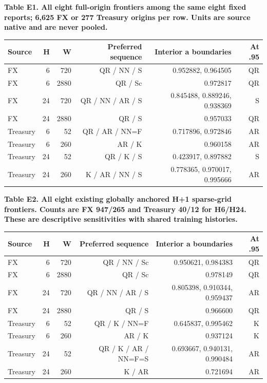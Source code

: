 \documentclass[10pt,a4paper]{article}
\begin{document}
\begin{center}
\begin{minipage}{\linewidth}
\small\textbf{Table E1. All eight full-origin frontiers among the same eight fixed reports; 6,625 FX or 277 Treasury origins per row. Units are source native and are never pooled.}\par\medskip
\centering\fontsize{8}{10}\selectfont
\begin{tabular}{lrrrrr}
\toprule
Source & H & W & Preferred sequence & Interior a boundaries & At .95 \\
\midrule
FX & 6 & 720 & QR / NN / S & 0.952882, 0.964505 & QR \\
FX & 6 & 2880 & QR / Sc & 0.972817 & QR \\
FX & 24 & 720 & QR / NN / AR / S & 0.845488, 0.889246, 0.938369 & S \\
FX & 24 & 2880 & QR / S & 0.957033 & QR \\
Treasury & 6 & 52 & QR / AR / NN=F & 0.717896, 0.972846 & AR \\
Treasury & 6 & 260 & AR / K & 0.960158 & AR \\
Treasury & 24 & 52 & QR / K / S & 0.423917, 0.897882 & S \\
Treasury & 24 & 260 & K / AR / NN / S & 0.778365, 0.970017, 0.995666 & AR \\
\bottomrule
\end{tabular}
\end{minipage}
\end{center}
\begin{center}
\begin{minipage}{\linewidth}
\small\textbf{Table E2. All eight existing globally anchored H+1 sparse-grid frontiers. Counts are FX 947/265 and Treasury 40/12 for H6/H24. These are descriptive sensitivities with shared training histories.}\par\medskip
\centering\fontsize{8}{10}\selectfont
\begin{tabular}{lrrrrr}
\toprule
Source & H & W & Preferred sequence & Interior a boundaries & At .95 \\
\midrule
FX & 6 & 720 & QR / NN / Sc & 0.950621, 0.984383 & QR \\
FX & 6 & 2880 & QR / Sc & 0.978149 & QR \\
FX & 24 & 720 & QR / NN / AR / S & 0.805398, 0.910344, 0.959437 & AR \\
FX & 24 & 2880 & QR / S & 0.966600 & QR \\
Treasury & 6 & 52 & QR / K / NN=F & 0.645837, 0.995462 & K \\
Treasury & 6 & 260 & AR / K & 0.937124 & K \\
Treasury & 24 & 52 & QR / K / AR / NN=F=S & 0.693667, 0.940131, 0.990484 & AR \\
Treasury & 24 & 260 & K / AR & 0.721694 & AR \\
\bottomrule
\end{tabular}
\end{minipage}
\end{center}
\end{document}
